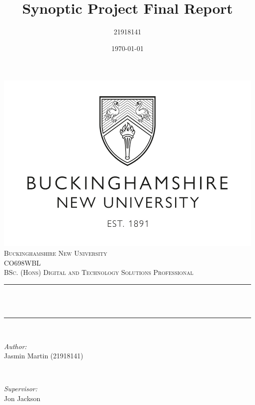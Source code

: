 \documentclass{article}
\title{Synoptic Project Final Report}	%
\author{21918141}		%
\date{\today}			%
\makeatletter
\let\thetitle\@title
\let\thedate\@date
\makeatother
\begin{document}
\begin{titlepage}
  \centering
  \vspace*{0.5 cm}
  \includegraphics[scale = 0.15]{images/bucks-logo.jpeg}\\[1.0 cm]	   %
  \textsc{\LARGE Buckinghamshire New University}\\[2.0 cm]	   %
  \textsc{\Large CO698WBL }\\[0.5 cm] %
  \textsc{\large BSc. (Hons) Digital and Technology Solutions Professional}\\[0.5 cm]			%
  \rule{\linewidth}{0.2 mm} \\[0.4 cm]
       { \huge \bfseries \thetitle}\\
       \rule{\linewidth}{0.2 mm} \\[1.5 cm]

       \begin{minipage}{0.4\textwidth}
	 \begin{flushleft} \large
	   \emph{Author:}\\
           Jasmin Martin (21918141)    %
	 \end{flushleft}
       \end{minipage}~
       \begin{minipage}{0.4\textwidth}
	 \begin{flushright} \large
	   \emph{Supervisor:} \\
           Jon Jackson     %
	 \end{flushright}
       \end{minipage}\\[2 cm] 

       {\large \thedate}\\[2 cm]

       \vfill

\end{titlepage}
\end{document}
